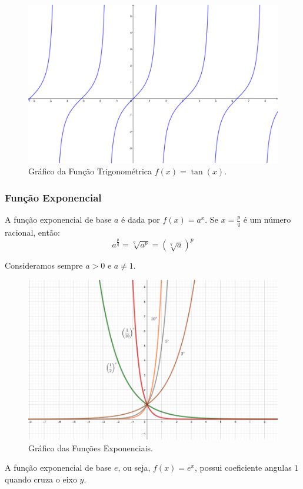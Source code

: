 \documentclass[oneside,a4paper,12pt]{article}
\begin{document}
\begin{figure}[h!]
	\centering
	\includegraphics[width=0.7\linewidth]{Figuras/tan}
	\caption{Gráfico da Função Trigonométrica $f(x) = \displaystyle \tan(x)$.}
\end{figure}

\subsubsection{Função Exponencial}

A função exponencial de base $a$ é dada por $f(x) = a^{x}$. Se $x = \frac{p}{q}$ é um número racional, então:
$$a^{\frac{p}{q}} = \sqrt[q]{a^p} = (\sqrt[q]{a})^{p}$$

Consideramos sempre $a>0$ e $a \neq 1$.

\begin{figure}[h!]
	\centering
	\includegraphics[width=0.8\linewidth]{Figuras/exp}
	\caption{Gráfico das Funções Exponenciais.}
\end{figure}

\newpage

A função exponencial de base $e$, ou seja, $f(x) = e^{x}$, possui coeficiente angulas $1$ quando cruza o eixo $y$.
\end{document}
